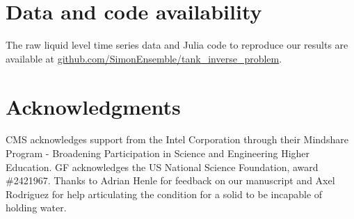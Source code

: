 \documentclass[a4paper,fleqn]{cas-dc}
\begin{document}
\section*{Data and code availability} The raw liquid level time series data and Julia code to reproduce our results are available at \url{github.com/SimonEnsemble/tank_inverse_problem}.


\section*{Acknowledgments}
CMS acknowledges support from the Intel Corporation through their Mindshare Program - Broadening Participation in Science and Engineering Higher Education. 
GF acknowledges the US National Science Foundation, award \#2421967. 
Thanks to 
Adrian Henle for feedback on our manuscript and Axel Rodriguez for help articulating the condition for a solid to be incapable of holding water.


\printcredits

%





\end{document}
